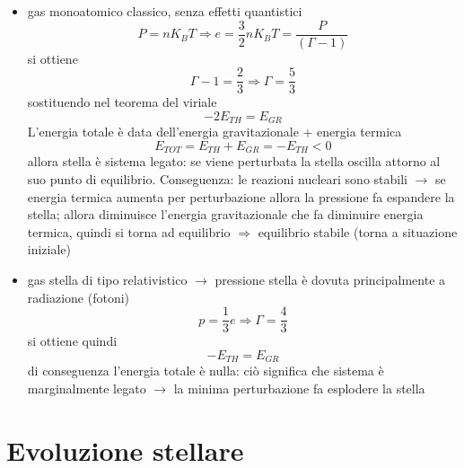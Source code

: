 \documentclass[a4paper,11pt]{report}
\theoremstyle{remark}
\theoremstyle{definition}
\begin{document}
\begin{itemize}
    \item gas monoatomico classico, senza effetti quantistici
    \begin{equation*}
        P = n K_B T \Rightarrow e = \frac{3}{2}n K_B T = \frac{P}{(\Gamma - 1)}
    \end{equation*}
    si ottiene
    \begin{equation*}
        \Gamma - 1 = \frac{2}{3} \Rightarrow \Gamma = \frac{5}{3}
    \end{equation*}
    sostituendo nel teorema del viriale
    \begin{equation*}
        -2 E_{TH} = E_{GR}
    \end{equation*}
    L'energia totale è data dell'energia gravitazionale + energia termica
    \begin{equation*}
        E_{TOT} = E_{TH} + E_{GR} = -E_{TH} < 0
    \end{equation*}
    allora stella è sistema legato: se viene perturbata la stella oscilla attorno al suo punto di equilibrio. Conseguenza: le reazioni nucleari sono stabili $\rightarrow$ se energia termica aumenta per perturbazione allora la pressione fa espandere la stella; allora diminuisce l'energia gravitazionale che fa diminuire energia termica, quindi si torna ad equilibrio $\Rightarrow$ equilibrio stabile (torna a situazione iniziale)
    \item gas stella di tipo relativistico $\rightarrow$ pressione stella è dovuta principalmente a radiazione (fotoni)
    \begin{equation*}
        p = \frac{1}{3} e \Rightarrow \Gamma = \frac{4}{3}
    \end{equation*}
    si ottiene quindi 
    \begin{equation*}
        -E_{TH} = E_{GR}
    \end{equation*}
    di conseguenza l'energia totale è nulla: ciò significa che sistema è marginalmente legato $\rightarrow$ la minima perturbazione fa esplodere la stella
\end{itemize}

\chapter{Evoluzione stellare}
\end{document}
